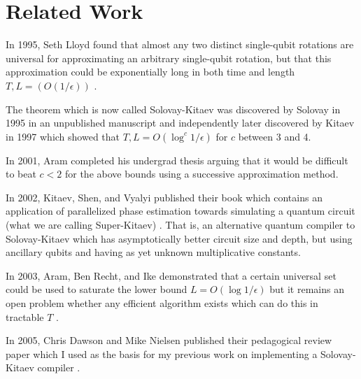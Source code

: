 \section{Related Work}

In 1995, Seth Lloyd found that almost any two distinct single-qubit rotations are
universal for approximating an arbitrary single-qubit rotation, but that this
approximation could be exponentially long in both time and length $T,L = (O(1/\epsilon))$ \cite{Lloyd1995}.

The theorem which is now called Solovay-Kitaev was discovered by Solovay in
1995 in an unpublished manuscript and independently later discovered by
Kitaev in 1997 \cite{nc00} which showed that $T,L = O(\log^c{1/\epsilon})$ for
$c$ between 3 and 4.

In 2001, Aram completed his undergrad thesis arguing that it would be difficult
to beat $c < 2$ for the above bounds using a successive approximation method.\cite{harrow01}

In 2002, Kitaev, Shen, and Vyalyi published their book which contains an
application of parallelized phase estimation towards simulating a quantum
circuit (what we are calling Super-Kitaev) \cite{ksv02}.
That is, an alternative quantum compiler to Solovay-Kitaev which has
asymptotically better circuit size and depth, but using ancillary qubits
and having as yet unknown multiplicative constants.

In 2003, Aram, Ben Recht, and Ike demonstrated that a certain universal
set could be used to saturate the lower bound $L=O(\log{1/\epsilon})$
but it remains an open problem whether any efficient algorithm exists
which can do this in tractable $T$ \cite{hrc02}.

In 2005, Chris Dawson and Mike Nielsen published their pedagogical review
paper which I used as the basis for my previous work on implementing a
Solovay-Kitaev compiler \cite{Dawson2005}.
